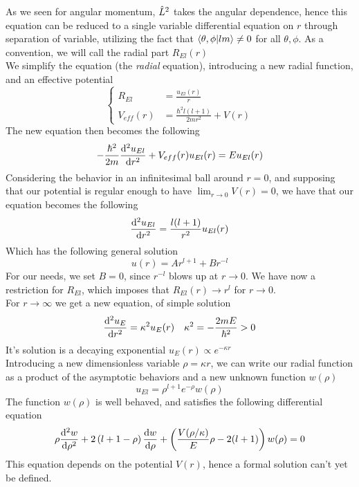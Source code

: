 \documentclass[../qm.tex]{subfiles}
\begin{document}
	As we seen for angular momentum, $\hat{L}^2$ takes the angular dependence, hence this equation can be reduced to a single variable differential equation on $r$ through separation of variable, utilizing the fact that $\bra{\theta,\phi}\ket{lm}\ne0$ for all $\theta,\phi$. As a convention, we will call the radial part $R_{El}(r)$\\
	We simplify the equation (the \textit{radial} equation), introducing a new radial function, and an effective potential
	\begin{equation}
		\left\{\begin{aligned}
			R_{El}&=\frac{u_{El}(r)}{r}\\
			V_{eff}(r)&=\frac{\hbar^2l(l+1)}{2mr^2}+V(r)
		\end{aligned}\right.
		\label{eq:substitutionsradeq}
	\end{equation}
	The new equation then becomes the following
	\begin{equation}
		-\frac{\hbar^2}{2m}\derivative[2]{u_{El}}{r}+V_{eff}(r)u_{El}(r)=Eu_{El}(r)
		\label{eq:newradeq}
	\end{equation}
	Considering the behavior in an infinitesimal ball around $r=0$, and supposing that our potential is regular enough to have $\lim_{r\to0}V(r)=0$, we have that our equation becomes the following
	\begin{equation}
		\derivative[2]{u_{El}}{r}=\frac{l(l+1)}{r^2}u_{El}(r)
		\label{eq:aroundr0behavior}
	\end{equation}
	Which has the following general solution
	\begin{equation*}
		u(r)=Ar^{l+1}+Br^{-l}
	\end{equation*}
	For our needs, we set $B=0$, since $r^{-l}$ blows up at $r\to0$. We have now a restriction for $R_{El}$, which imposes that $R_{El}(r)\to r^{l}$ for $r\to0$.\\
	For $r\to\infty$ we get a new equation, of simple solution
	\begin{equation}
		\derivative[2]{u_{E}}{r}=\kappa^2u_{E}(r)\quad\kappa^2=-\frac{2mE}{\hbar^2}>0
		\label{eq:rtoinftyradeq}
	\end{equation}
	It's solution is a decaying exponential $u_E(r)\propto e^{-\kappa r}$\\
	Introducing a new dimensionless variable $\rho=\kappa r$, we can write our radial function as a product of the asymptotic behaviors and a new unknown function $w(\rho)$
	\begin{equation*}
		u_{El}=\rho^{l+1}e^{-\rho}w(\rho)
	\end{equation*}
	The function $w(\rho)$ is well behaved, and satisfies the following differential equation
	\begin{equation}
		\rho\derivative[2]{w}{\rho}+2\left( l+1-\rho \right)\derivative{w}{\rho}+\left( \frac{V(\rho/\kappa)}{E}\rho-2(l+1) \right)w(\rho)=0
		\label{eq:wrhodiffeq}
	\end{equation}
	This equation depends on the potential $V(r)$, hence a formal solution can't yet be defined.
\end{document}
